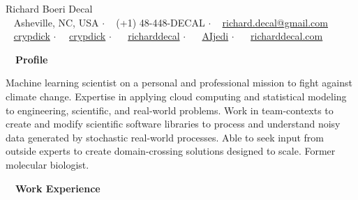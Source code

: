 \documentclass[a4paper,12pt]{article}
\newcommand{\resheading}[1]{{\hspace{-9pt} \colorbox{mygrey}{\begin{minipage}{\textwidth}{\textmd{~~\large \textbf{#1} \vphantom{p\^{E}}}}\end{minipage}}\vspace{6pt}} }
\begin{document}
\begin{center}
{\Huge Richard Boeri Decal} \\
{\small \faMapMarker~ Asheville, NC, USA $\cdot$ \faPhone~ (+1) 48-448-DECAL $\cdot$ \faEnvelope~ \href{mailto:richard.decal@gmail.com}{richard.decal@gmail.com}  \\ \faGithubAlt~ \href{https://github.com/crypdick}{crypdick} $\cdot$~\faStackOverflow~  \href{https://stackoverflow.com/users/4212158/crypdick}{crypdick} $\cdot$ ~\faLinkedin~ \href{https://www.linkedin.com/in/richarddecal/}{richarddecal}  $\cdot$ ~\faTwitter~ \href{https://twitter.com/AIjedi}{AIjedi}  $\cdot$ ~\faHome~  \href{http://www.richarddecal.com}{richarddecal.com}}
\end{center}

\resheading{Profile}

Machine learning scientist on a personal and professional mission to fight against climate change. Expertise in applying cloud computing and statistical modeling to engineering, scientific, and real-world problems. Work in team-contexts to create and modify scientific software libraries to process and understand noisy data generated by stochastic real-world processes. Able to seek input from outside experts to create domain-crossing solutions designed to scale. Former molecular biologist.\\

\resheading{Work Experience}

% 
% 
\end{document}
